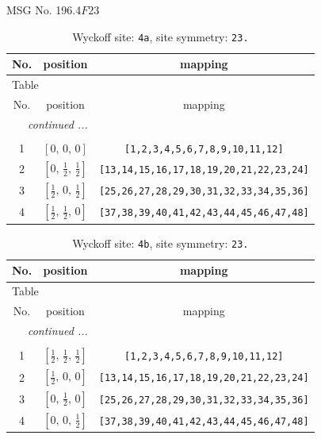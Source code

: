 \documentclass[fleqn,8pt]{jsarticle}
\begin{document}
\setcounter{MaxMatrixCols}{32}

\renewcommand{\tablename}{Table~}
\renewcommand{\figurename}{Figure~}
\begin{center}
\LARGE
MSG No. 196.4\quad$F23$
\end{center}
\renewcommand{\arraystretch}{1.2}
\begin{longtable}{ccc}
\caption{Wyckoff site: {\tt 4a}, site symmetry: {\tt 23.}}
 \\
 \hline \hline
No. & position & mapping \\ \hline \endfirsthead

\multicolumn{2}{l}{\tablename\ \thetable{}} \\
 \hline \hline
No. & position & mapping \\ \hline \endhead

 \hline \hline
\multicolumn{2}{r}{\footnotesize\it continued ...} \\ \endfoot

 \hline \hline
\multicolumn{2}{r}{} \\ \endlastfoot

1 & $\left[ 0,\, 0,\, 0 \right]$ & {\tt [1,2,3,4,5,6,7,8,9,10,11,12]} \\ \hline
2 & $\left[ 0,\, \frac{1}{2},\, \frac{1}{2} \right]$ & {\tt [13,14,15,16,17,18,19,20,21,22,23,24]} \\ \hline
3 & $\left[ \frac{1}{2},\, 0,\, \frac{1}{2} \right]$ & {\tt [25,26,27,28,29,30,31,32,33,34,35,36]} \\ \hline
4 & $\left[ \frac{1}{2},\, \frac{1}{2},\, 0 \right]$ & {\tt [37,38,39,40,41,42,43,44,45,46,47,48]} \\
\end{longtable}
\renewcommand{\arraystretch}{1.2}
\begin{longtable}{ccc}
\caption{Wyckoff site: {\tt 4b}, site symmetry: {\tt 23.}}
 \\
 \hline \hline
No. & position & mapping \\ \hline \endfirsthead

\multicolumn{2}{l}{\tablename\ \thetable{}} \\
 \hline \hline
No. & position & mapping \\ \hline \endhead

 \hline \hline
\multicolumn{2}{r}{\footnotesize\it continued ...} \\ \endfoot

 \hline \hline
\multicolumn{2}{r}{} \\ \endlastfoot

1 & $\left[ \frac{1}{2},\, \frac{1}{2},\, \frac{1}{2} \right]$ & {\tt [1,2,3,4,5,6,7,8,9,10,11,12]} \\ \hline
2 & $\left[ \frac{1}{2},\, 0,\, 0 \right]$ & {\tt [13,14,15,16,17,18,19,20,21,22,23,24]} \\ \hline
3 & $\left[ 0,\, \frac{1}{2},\, 0 \right]$ & {\tt [25,26,27,28,29,30,31,32,33,34,35,36]} \\ \hline
4 & $\left[ 0,\, 0,\, \frac{1}{2} \right]$ & {\tt [37,38,39,40,41,42,43,44,45,46,47,48]} \\
\end{longtable}
\end{document}
